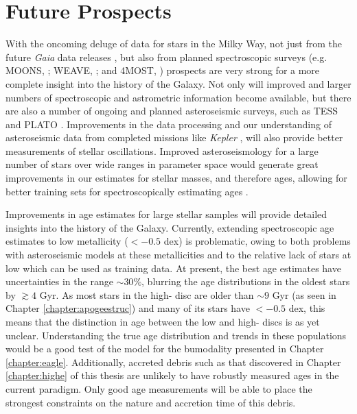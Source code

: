 \section{Future Prospects}
\label{sec:future}
With the oncoming deluge of data for stars in the Milky Way, not just from the future \emph{Gaia} data releases \citep[which will include epoch spectroscopy and photometry, offering the potential to mine the data for element abundances and ages, e.g.][]{2016A&A...595A...1G}, but also from planned spectroscopic surveys (e.g. MOONS, \citeauthor{2012SPIE.8446E..0SC} \citeyear{2012SPIE.8446E..0SC}; WEAVE, \citeauthor{2012SPIE.8446E..0PD} \citeyear{2012SPIE.8446E..0PD}; and 4MOST, \citeauthor{2016SPIE.9908E..1OD} \citeyear{2016SPIE.9908E..1OD}) prospects are very strong for a more complete insight into the history of the Galaxy. Not only will improved and larger numbers of spectroscopic and astrometric information become available, but there are also a number of ongoing and planned asteroseismic surveys, such as TESS \citep{2015JATIS...1a4003R} and PLATO \citep[e.g.][]{2017AN....338..644M}. Improvements in the data processing and our understanding of asteroseismic data from completed missions like \emph{Kepler} \citep{2010Sci...327..977B}, will also provide better measurements of stellar oscillations. Improved asteroseismology for a large number of stars over wide ranges in parameter space would generate great improvements in our estimates for stellar masses, and therefore ages, allowing for better training sets for spectroscopically estimating ages \citep[Such as those in Chapter \ref{chapter:apogeestruc}, from methods like that of e.g.][]{2016MNRAS.456.3655M}. 

Improvements in age estimates for large stellar samples will provide detailed insights into the history of the Galaxy. Currently, extending spectroscopic age estimates to low metallicity (\feh{}$< -0.5$ dex) is problematic, owing to both problems with asteroseismic models at these metallicities \citep[e.g.][]{2014ApJ...785L..28E} and to the relative lack of stars at low \feh{} which can be used as training data. At present, the best age estimates have uncertainties in the range $\sim 30\%$, blurring the age distributions in the oldest stars by $\gtrsim 4$ Gyr. As most stars in the high-\afe{} disc are older than $\sim 9$ Gyr (as seen in Chapter \ref{chapter:apogeestruc}) and many of its stars have \feh$< -0.5$ dex, this means that the distinction in age between the low and high-\afe{} discs is as yet unclear. Understanding the true age distribution and trends in these populations would be a good test of the model for the \afe{} bumodality presented in Chapter \ref{chapter:eagle}. Additionally, accreted debris such as that discovered in Chapter \ref{chapter:highe} of this thesis are unlikely to have robustly measured ages in the current paradigm. Only good age measurements will be able to place the strongest constraints on the nature and accretion time of this debris. 

